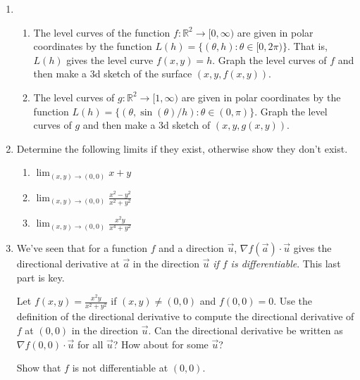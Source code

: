 \documentclass[letter]{article}
\newcommand{\R}{\mathbb{R}}
\begin{document}
\begin{enumerate}
		\item 
			\begin{enumerate}
				\item The level curves of the function $f:\R^2\to [0,\infty)$ are given 
					in polar coordinates by the function
					$L(h)=\{(\theta, h):\theta\in [0,2\pi)\}$.  That is, 
						$L(h)$ gives the level curve $f(x,y)=h$.  Graph the level curves
						of $f$ and then make a 3d
						sketch of the surface $(x,y,f(x,y))$.
					\item The level curves of $g:\R^2\to [1,\infty)$ are given in polar coordinates by the function
							$L(h)=\{(\theta, \sin(\theta)/h):\theta\in(0,\pi)\}$.
							Graph the level curves of $g$ and then make a 3d sketch of $(x,y,g(x,y))$.
			\end{enumerate}
		\item Determine the following limits if they exist, otherwise show they don't exist.
			\begin{enumerate}
				\item $\displaystyle\lim_{(x,y)\to(0,0)} x+y$
				\item $\displaystyle\lim_{(x,y)\to(0,0)} \frac{x^2-y^2}{x^2+y^2}$
				\item $\displaystyle\lim_{(x,y)\to(0,0)} \frac{x^2y}{x^4+y^2}$
			\end{enumerate}

		\item We've seen that for a function $f$ and a direction $\vec u$, $\nabla f(\vec a)\cdot \vec u$ gives
			the directional derivative at $\vec a$ in the direction $\vec u$ \emph{if $f$ is differentiable}.
			This last part is key.

			Let $f(x,y) = \frac{x^2y}{x^2+y^2}$ if $(x,y)\neq (0,0)$ and $f(0,0) = 0$.  Use the definition
			of the directional derivative to compute the directional derivative of $f$ at $(0,0)$ in the direction
			$\vec u$.  Can the directional derivative be written as $\nabla f(0,0)\cdot \vec u$ for all $\vec u$?
			How about for some $\vec u$?

			Show that $f$ is not differentiable at $(0,0)$.
	\end{enumerate}
\end{document}
